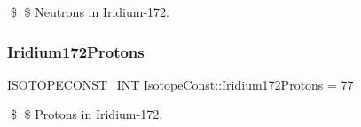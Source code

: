 \$ \$ Neutrons in Iridium-\/172. \mbox{\label{group___isotope_const-_iridium-_ir172_gafbbb65aee311b86a75f773213a70392b}} 
\subsubsection{\texorpdfstring{Iridium172\+Protons}{Iridium172Protons}}
{\footnotesize\ttfamily \mbox{\hyperlink{group___isotope_const-_macros_ga5f18360b3e99483a35c32d789e62621c}{I\+S\+O\+T\+O\+P\+E\+C\+O\+N\+S\+T\+\_\+\+I\+NT}} Isotope\+Const\+::\+Iridium172\+Protons = 77}

\$ \$ Protons in Iridium-\/172. 